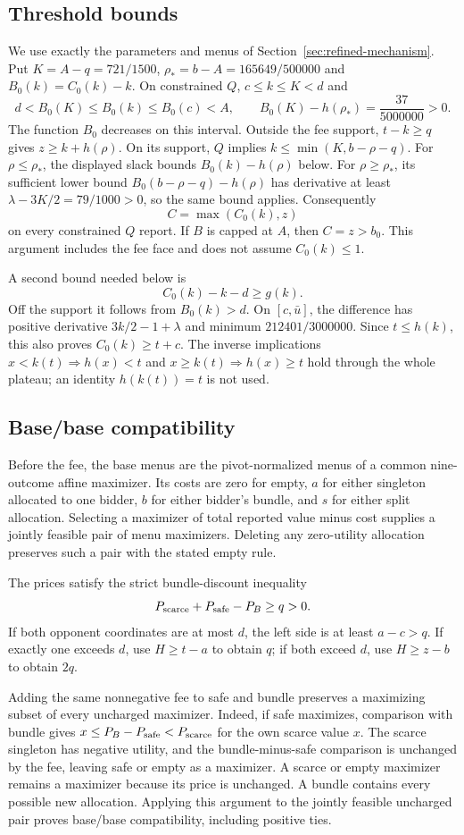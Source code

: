 \subsection{Threshold bounds}
We use exactly the parameters and menus of Section~\ref{sec:refined-mechanism}.
Put $K=A-q=721/1500$, $\rho_*=b-A=165649/500000$ and
$B_0(k)=C_0(k)-k$. On constrained $Q$, $c\le k\le K<d$ and
\[
 d<B_0(K)\le B_0(k)\le B_0(c)<A,\qquad
 B_0(K)-h(\rho_*)=\frac{37}{5000000}>0.
\]
The function $B_0$ decreases on this interval. Outside the fee support,
$t-k\ge q$ gives $z\ge k+h(\rho)$. On its support, $Q$ implies
$k\le\min(K,b-\rho-q)$. For $\rho\le\rho_*$, the displayed slack
bounds $B_0(k)-h(\rho)$ below. For $\rho\ge\rho_*$, its sufficient
lower bound $B_0(b-\rho-q)-h(\rho)$ has derivative at least
$\lambda-3K/2=79/1000>0$, so the same bound applies. Consequently
\[
 C=\max(C_0(k),z)
\]
on every constrained $Q$ report. If $B$ is capped at $A$, then $C=z>b_0$.
This argument includes the fee face and does not assume $C_0(k)\le1$.

A second bound needed below is
\[
 C_0(k)-k-d\ge g(k).
\]
Off the support it follows from $B_0(k)>d$. On $[c,\bar u]$, the
difference has positive derivative $3k/2-1+\lambda$ and minimum
$212401/3000000$. Since $t\le h(k)$, this also proves $C_0(k)\ge t+c$.
The inverse implications $x<k(t)\Rightarrow h(x)<t$ and
$x\ge k(t)\Rightarrow h(x)\ge t$ hold through the whole plateau;
an identity $h(k(t))=t$ is not used.

\subsection{Base/base compatibility}
Before the fee, the base menus are the pivot-normalized menus of a common
nine-outcome affine maximizer. Its costs are zero for empty, $a$ for either
singleton allocated to one bidder, $b$ for either bidder's bundle, and $s$
for either split allocation. Selecting a maximizer of total reported value
minus cost supplies a jointly feasible pair of menu maximizers. Deleting
any zero-utility allocation preserves such a pair with the stated empty rule.

The prices satisfy the strict bundle-discount inequality
\[
 P_{\rm scarce}+P_{\rm safe}-P_B\ge q>0.
\]
If both opponent coordinates are at most $d$, the left side is at least
$a-c>q$. If exactly one exceeds $d$, use $H\ge t-a$ to obtain $q$;
if both exceed $d$, use $H\ge z-b$ to obtain $2q$.

Adding the same nonnegative fee to safe and bundle preserves a maximizing
subset of every uncharged maximizer. Indeed, if safe maximizes, comparison
with bundle gives $x\le P_B-P_{\rm safe}<P_{\rm scarce}$ for the own
scarce value $x$. The scarce singleton has negative utility, and the
bundle-minus-safe comparison is unchanged by the fee, leaving safe or empty
as a maximizer. A scarce or empty maximizer remains a maximizer because
its price is unchanged. A bundle contains every possible new allocation.
Applying this argument to the jointly feasible uncharged pair proves
base/base compatibility, including positive ties.

